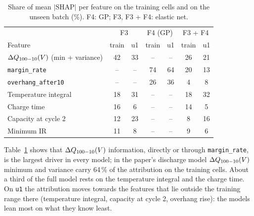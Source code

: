 \begin{table}[t]
\centering
\caption{Share of mean $|\mathrm{SHAP}|$ per feature on the training cells
and on the unseen batch (\%). F4: GP; F3, F3 + F4: elastic net.}
\label{tab:p5imp}
\setlength{\tabcolsep}{3pt}
\begin{tabular}{@{}lcccccc@{}}
\toprule
& \multicolumn{2}{c}{F3} & \multicolumn{2}{c}{F4 (GP)} & \multicolumn{2}{c}{F3 + F4} \\
Feature & train & u1 & train & u1 & train & u1 \\
\midrule
$\Delta Q_{100-10}(V)$ (min + variance) & 42 & 33 & -- & -- & 26 & 21 \\
\texttt{margin\_rate} & -- & -- & 74 & 64 & 20 & 13 \\
\texttt{overhang\_after10} & -- & -- & 26 & 36 & 4 & 8 \\
Temperature integral & 18 & 31 & -- & -- & 18 & 32 \\
Charge time & 16 & 6 & -- & -- & 14 & 5 \\
Capacity at cycle 2 & 12 & 23 & -- & -- & 8 & 16 \\
Minimum IR & 11 & 8 & -- & -- & 9 & 6 \\
\bottomrule
\end{tabular}
\end{table}

Table~\ref{tab:p5imp} shows that $\Delta Q_{100-10}(V)$ information, directly or through
\texttt{margin\_rate}, is the largest driver in every model; in the paper's
discharge model $\Delta Q_{100-10}(V)$ minimum and variance carry 64\,\% of the attribution on
the training cells. About a third of the full model rests on the temperature
integral and the charge time. On \texttt{u1} the attribution moves towards the
features that lie outside the training range there (temperature integral,
capacity at cycle 2, overhang rise): the models lean most on what they know
least.

